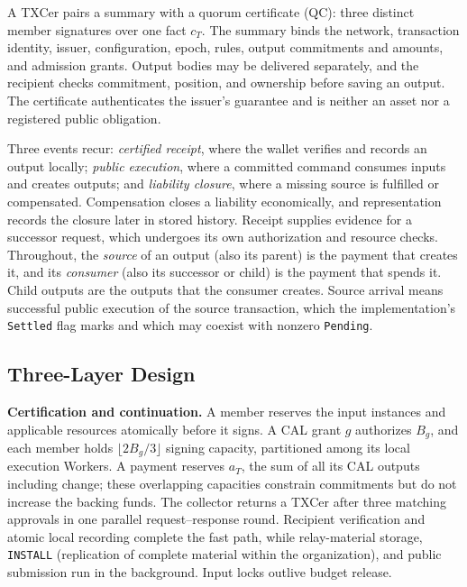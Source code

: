 A TXCer pairs a summary with a quorum certificate (QC): three distinct member signatures over one fact $c_T$. The summary binds the network, transaction identity, issuer, configuration, epoch, rules, output commitments and amounts, and admission grants. Output bodies may be delivered separately, and the recipient checks commitment, position, and ownership before saving an output. The certificate authenticates the issuer's guarantee and is neither an asset nor a registered public obligation.

Three events recur: \emph{certified receipt}, where the wallet verifies and records an output locally; \emph{public execution}, where a committed command consumes inputs and creates outputs; and \emph{liability closure}, where a missing source is fulfilled or compensated. Compensation closes a liability economically, and representation records the closure later in stored history. Receipt supplies evidence for a successor request, which undergoes its own authorization and resource checks. Throughout, the \emph{source} of an output (also its parent) is the payment that creates it, and its \emph{consumer} (also its successor or child) is the payment that spends it. Child outputs are the outputs that the consumer creates. Source arrival means successful public execution of the source transaction, which the implementation's \texttt{Settled} flag marks and which may coexist with nonzero \texttt{Pending}.

\subsection{Three-Layer Design}
\label{sec:model-layers}
\noindent\textbf{Certification and continuation.}
A member reserves the input instances and applicable resources atomically before it signs. A CAL grant $g$ authorizes $B_g$, and each member holds $\lfloor2B_g/3\rfloor$ signing capacity, partitioned among its local execution Workers. A payment reserves $a_T$, the sum of all its CAL outputs including change; these overlapping capacities constrain commitments but do not increase the backing funds. The collector returns a TXCer after three matching approvals in one parallel request--response round. Recipient verification and atomic local recording complete the fast path, while relay-material storage, \texttt{INSTALL} (replication of complete material within the organization), and public submission run in the background. Input locks outlive budget release.


